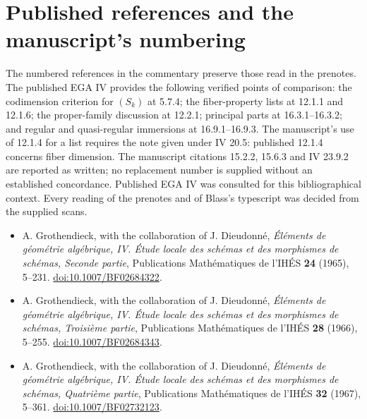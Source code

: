 \documentclass[10pt,a4paper]{article}
\begin{document}
\section*{Published references and the manuscript's numbering}
The numbered references in the commentary preserve those read in the prenotes. The published EGA IV provides the following verified points of comparison: the codimension criterion for $(S_k)$ at 5.7.4; the fiber-property lists at 12.1.1 and 12.1.6; the proper-family discussion at 12.2.1; principal parts at 16.3.1--16.3.2; and regular and quasi-regular immersions at 16.9.1--16.9.3. The manuscript's use of 12.1.4 for a list requires the note given under IV 20.5: published 12.1.4 concerns fiber dimension. The manuscript citations 15.2.2, 15.6.3 and IV 23.9.2 are reported as written; no replacement number is supplied without an established concordance. Published EGA IV was consulted for this bibliographical context. Every reading of the prenotes and of Blass's typescript was decided from the supplied scans.

\begin{itemize}
\item A. Grothendieck, with the collaboration of J. Dieudonn\'e, \emph{\'El\'ements de g\'eom\'etrie alg\'ebrique, IV. \'Etude locale des sch\'emas et des morphismes de sch\'emas, Seconde partie}, Publications Math\'ematiques de l'IH\'ES \textbf{24} (1965), 5--231. \href{https://www.numdam.org/articles/10.1007/BF02684322/}{doi:10.1007/BF02684322}.
\item A. Grothendieck, with the collaboration of J. Dieudonn\'e, \emph{\'El\'ements de g\'eom\'etrie alg\'ebrique, IV. \'Etude locale des sch\'emas et des morphismes de sch\'emas, Troisi\`eme partie}, Publications Math\'ematiques de l'IH\'ES \textbf{28} (1966), 5--255. \href{https://www.numdam.org/articles/10.1007/BF02684343/}{doi:10.1007/BF02684343}.
\item A. Grothendieck, with the collaboration of J. Dieudonn\'e, \emph{\'El\'ements de g\'eom\'etrie alg\'ebrique, IV. \'Etude locale des sch\'emas et des morphismes de sch\'emas, Quatri\`eme partie}, Publications Math\'ematiques de l'IH\'ES \textbf{32} (1967), 5--361. \href{https://www.numdam.org/articles/10.1007/BF02732123/}{doi:10.1007/BF02732123}.
\end{itemize}
\par{}
\end{document}
